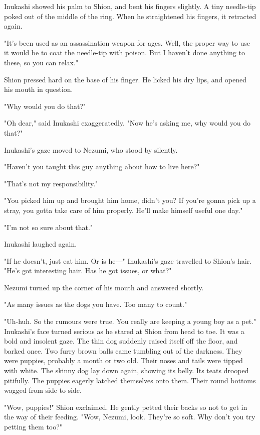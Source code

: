 Inukashi showed his palm to Shion, and bent his fingers slightly. A tiny
needle-tip poked out of the middle of the ring. When he straightened his
fingers, it retracted again.

"It's been used as an assassination weapon for ages. Well, the proper
way to use it would be to coat the needle-tip with poison. But I haven't
done anything to these, so you can relax."

Shion pressed hard on the base of his finger. He licked his dry lips,
and opened his mouth in question.

"Why would you do that?"

"Oh dear," said Inukashi exaggeratedly. "Now he's asking me, why would
you do that?"

Inukashi's gaze moved to Nezumi, who stood by silently.

"Haven't you taught this guy anything about how to live here?"

"That's not my responsibility."

"You picked him up and brought him home, didn't you? If you're gonna
pick up a stray, you gotta take care of him properly. He'll make himself
useful one day."

"I'm not so sure about that."

Inukashi laughed again.

"If he doesn't, just eat him. Or is he―" Inukashi's gaze travelled to
Shion's hair. "He's got interesting hair. Has he got issues, or what?"

Nezumi turned up the corner of his mouth and answered shortly.

"As many issues as the dogs you have. Too many to count."

"Uh-huh. So the rumours were true. You really are keeping a young boy as
a pet." Inukashi's face turned serious as he stared at Shion from head
to toe. It was a bold and insolent gaze. The thin dog suddenly raised
itself off the floor, and barked once. Two furry brown balls came
tumbling out of the darkness. They were puppies, probably a month or two
old. Their noses and tails were tipped with white. The skinny dog lay
down again, showing its belly. Its teats drooped pitifully. The puppies
eagerly latched themselves onto them. Their round bottoms wagged from
side to side.

"Wow, puppies!" Shion exclaimed. He gently petted their backs so not to
get in the way of their feeding. "Wow, Nezumi, look. They're so soft.
Why don't you try petting them too?"

